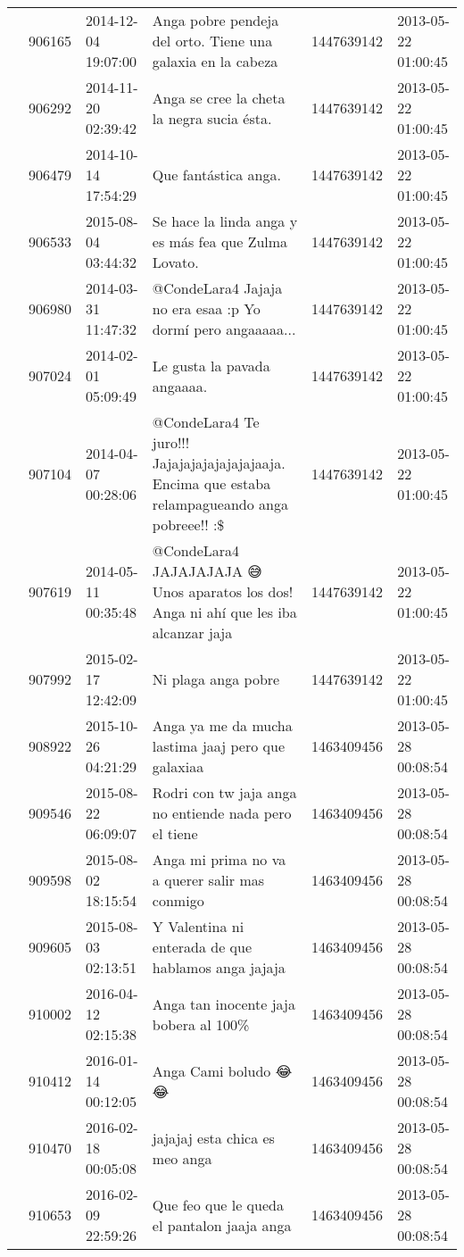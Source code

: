 \begin{tabular}{llllrl}
 & 906165& 2014-12-04 19:07:00 &Anga pobre pendeja del orto. Tiene una galaxia en la cabeza &1447639142 & 2013-05-22 01:00:45 \\
 & 906292& 2014-11-20 02:39:42 & Anga se cree la cheta la negra sucia ésta. &1447639142 & 2013-05-22 01:00:45 \\
 & 906479& 2014-10-14 17:54:29 & Que fantástica anga. &1447639142 & 2013-05-22 01:00:45 \\
 & 906533& 2015-08-04 03:44:32 & Se hace la linda anga y es más fea que Zulma Lovato. &1447639142 & 2013-05-22 01:00:45 \\
 & 906980& 2014-03-31 11:47:32 &@CondeLara4 Jajaja no era esaa :p Yo dormí pero angaaaaa... &1447639142 & 2013-05-22 01:00:45 \\
 & 907024& 2014-02-01 05:09:49 &Le gusta la pavada angaaaa. &1447639142 & 2013-05-22 01:00:45 \\
 & 907104& 2014-04-07 00:28:06 & @CondeLara4 Te juro!!! Jajajajajajajajajaaja. Encima que estaba relampagueando anga pobreee!! :\$ &1447639142 & 2013-05-22 01:00:45 \\
 & 907619& 2014-05-11 00:35:48 &@CondeLara4 JAJAJAJAJA 😅 Unos aparatos los dos! Anga ni ahí que les iba alcanzar jaja &1447639142 & 2013-05-22 01:00:45 \\
 & 907992& 2015-02-17 12:42:09 &Ni plaga anga pobre &1447639142 & 2013-05-22 01:00:45 \\
 & 908922& 2015-10-26 04:21:29 & Anga ya me da mucha lastima jaaj pero que galaxiaa &1463409456 & 2013-05-28 00:08:54 \\
 & 909546& 2015-08-22 06:09:07 &Rodri con tw jaja anga no entiende nada pero el tiene &1463409456 & 2013-05-28 00:08:54 \\
 & 909598& 2015-08-02 18:15:54 & Anga mi prima no va a querer salir mas conmigo &1463409456 & 2013-05-28 00:08:54 \\
 & 909605& 2015-08-03 02:13:51 &Y Valentina ni enterada de que hablamos anga jajaja &1463409456 & 2013-05-28 00:08:54 \\
 & 910002& 2016-04-12 02:15:38 &Anga tan inocente jaja bobera al 100\% &1463409456 & 2013-05-28 00:08:54 \\
 & 910412& 2016-01-14 00:12:05 &Anga Cami boludo 😂😂 &1463409456 & 2013-05-28 00:08:54 \\
 & 910470& 2016-02-18 00:05:08 & jajajaj esta chica es meo anga &1463409456 & 2013-05-28 00:08:54 \\
 & 910653& 2016-02-09 22:59:26 &Que feo que le queda el pantalon jaaja anga &1463409456 & 2013-05-28 00:08:54 \\

\end{tabular}
